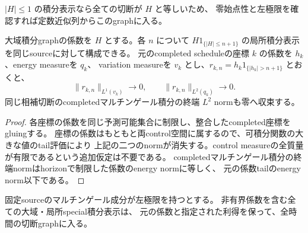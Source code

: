 $|H|\le1$ の積分表示なら全ての切断が $H$ と等しいため、
零始点性と左極限を確認すれば定数近似列からこのgraphに入る。

\begin{proposition}[非有界係数の切断列と座標ごとの誤差制御]
大域積分graphの係数を $H$ とする。各 $n$ について
$H1_{\{|H|\le n+1\}}$ の局所積分表示を同じsourceに対して構成できる。
元のcompleted scheduleの座標 $k$ の係数を $h_k$、energy measureを $q_k$、
variation measureを $v_k$ とし、$r_{k,n}=h_k1_{\{|h_k|>n+1\}}$ とおくと、
\[
 \|r_{k,n}\|_{L^1(v_k)}\longrightarrow0,\qquad
 \|r_{k,n}\|_{L^2(q_k)}\longrightarrow0.
\]
同じ相補切断のcompletedマルチンゲール積分の終端 $L^2$ normも零へ収束する。
\end{proposition}
\begin{proof}
各座標の係数を同じ予測可能集合に制限し、整合したcompleted座標をgluingする。
座標の係数はもともと両control空間に属するので、可積分関数の大きな値のtail評価により
上記の二つのnormが消失する。control measureの全質量が有限であるという追加仮定は不要である。
completedマルチンゲール積分の終端normはhorizonで制限した係数のenergy normに等しく、
元の係数tailのenergy norm以下である。
\end{proof}
\begin{proposition}[非有界係数の一様切断収束と包含]
固定sourceのマルチンゲール成分が左極限を持つとする。
非有界係数を含む全ての大域・局所special積分表示は、
元の係数と指定された利得を保って、全時間の切断graphに入る。
\end{proposition}
